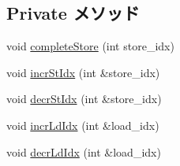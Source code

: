 \subsection*{Private メソッド}
\begin{DoxyCompactItemize}
\item 
void \hyperlink{classOzoneLSQ_a12ec7cad6ac51a53bca7795588885e5c}{completeStore} (int store\_\-idx)
\item 
void \hyperlink{classOzoneLSQ_a4ec2fe6ed54cf88c23fb214b87f850d1}{incrStIdx} (int \&store\_\-idx)
\item 
void \hyperlink{classOzoneLSQ_aa585a02e67713aeeabb73720e6c89388}{decrStIdx} (int \&store\_\-idx)
\item 
void \hyperlink{classOzoneLSQ_a0e0f98133b2afd7aa1793ba30dd4a96b}{incrLdIdx} (int \&load\_\-idx)
\item 
void \hyperlink{classOzoneLSQ_a73fc7794c8562f58407f59513a891c84}{decrLdIdx} (int \&load\_\-idx)
\end{DoxyCompactItemize}
